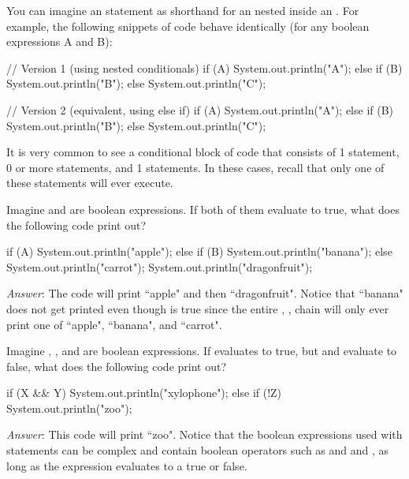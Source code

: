 You can imagine an  statement as shorthand for an  nested inside an . For example, the following snippets of code behave identically (for any boolean expressions A and B):

\begin{code}
// Version 1 (using nested conditionals)
if (A) {
    System.out.println("A");
} else {
    if (B) {
        System.out.println("B");
    } else {
        System.out.println("C");
    }
}

// Version 2 (equivalent, using else if)
if (A) {
    System.out.println("A");
} else if (B) {
    System.out.println("B");
} else {
    System.out.println("C");
}
\end{code}

It is very common to see a conditional block of code that consists of 1  statement, 0 or more  statements, and 1  statements. In these cases, recall that only one of these statements will ever execute.

\begin{example}
Imagine  and  are boolean expressions. If both of them evaluate to true, what does the following code print out?

\begin{code}
if (A) {
    System.out.println("apple");
} else if (B) {
    System.out.println("banana");
} else {
    System.out.println("carrot");
} 
System.out.println("dragonfruit");
\end{code}

\emph{Answer}: The code will print ``apple" and then ``dragonfruit". Notice that ``banana" does not get printed even though  is true since the entire , ,  chain will only ever print one of ``apple", ``banana", and ``carrot". 
\end{example}

\begin{example}
Imagine , , and  are boolean expressions. If  evaluates to true, but  and  evaluate to false, what does the following code print out?

\begin{code}
if (X && Y) {
    System.out.println("xylophone");
} else if (!Z) {
    System.out.println("zoo");
}
\end{code}

\emph{Answer}: This code will print ``zoo". Notice that the boolean expressions used with  statements can be complex and contain boolean operators such as \ic{&&} and \ic{||} and \ic{!}, as long as the expression evaluates to a true or false.
\end{example}

